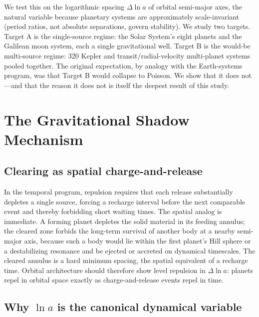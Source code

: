 \documentclass[12pt,a4paper]{article}
\begin{document}
We test this on the logarithmic spacing $\Delta\ln a$ of orbital semi-major axes, the natural variable because planetary systems are approximately scale-invariant (period ratios, not absolute separations, govern stability). We study two targets. Target A is the single-source regime: the Solar System's eight planets and the Galilean moon system, each a single gravitational well. Target B is the would-be multi-source regime: 320 Kepler and transit/radial-velocity multi-planet systems pooled together. The original expectation, by analogy with the Earth-systems program, was that Target B would collapse to Poisson. We show that it does not---and that the reason it does not is itself the deepest result of this study.

\section{The Gravitational Shadow Mechanism}

\subsection{Clearing as spatial charge-and-release}

In the temporal program, repulsion requires that each release substantially depletes a single source, forcing a recharge interval before the next comparable event and thereby forbidding short waiting times. The spatial analog is immediate. A forming planet depletes the solid material in its feeding annulus; the cleared zone forbids the long-term survival of another body at a nearby semi-major axis, because such a body would lie within the first planet's Hill sphere or a destabilizing resonance and be ejected or accreted on dynamical timescales. The cleared annulus is a hard minimum spacing, the spatial equivalent of a recharge time. Orbital architecture should therefore show level repulsion in $\Delta\ln a$: planets repel in orbital space exactly as charge-and-release events repel in time.

\subsection{Why $\ln a$ is the canonical dynamical variable}
\end{document}
